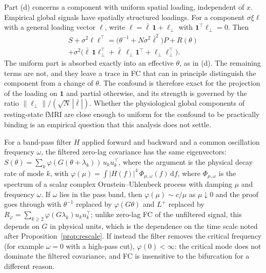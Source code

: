 \begin{remark}\label{rem:loading}
Part (d) concerns a component with uniform spatial loading, independent of $x$. Empirical global
signals have spatially structured loadings. For a component $\sigma\xi\ell$ with a general loading
vector $\ell$, write $\ell=\bar\ell\,\mathbf 1+\ell_\perp$ with $\mathbf 1^{\top}\ell_\perp=0$. Then
\begin{multline*}
  S+\sigma^{2}\ell\ell^{\top}=\bigl(\theta^{-1}+N\sigma^{2}\bar\ell^{2}\bigr)P+R(\theta)\\
  +\sigma^{2}\bigl(\bar\ell\,\mathbf 1\ell_\perp^{\top}+\bar\ell\,\ell_\perp\mathbf 1^{\top}+\ell_\perp\ell_\perp^{\top}\bigr).
\end{multline*}
The uniform part is absorbed exactly into an effective $\theta$, as in (d). The remaining terms are
not, and they leave a trace in FC that can in principle distinguish the component from a change of
$\theta$. The confound is therefore exact for the projection of the loading on $\mathbf 1$ and partial
otherwise, and its strength is governed by the ratio $\|\ell_\perp\|/(\sqrt N\,|\bar\ell|)$. Whether
the physiological global components of resting-state fMRI are close enough to uniform for the
confound to be practically binding is an empirical question that this analysis does not settle.
\end{remark}

\begin{remark}\label{rem:gsr-filter}
For a band-pass filter $H$ applied forward and backward and a common oscillation frequency $\omega$, the filtered zero-lag
covariance has the same eigenvectors:
$S(\theta)=\sum_k\varphi(G(\theta+\lambda_k))\,u_ku_k^{\top}$, where the argument is the physical decay rate of mode $k$, with
$\varphi(\mu)=\int|H(f)|^{4}\,\Phi_{\mu,\omega}(f)\,\mathrm df$, where $\Phi_{\mu,\omega}$ is the spectrum
of a scalar complex Ornstein--Uhlenbeck process with damping $\mu$ and frequency $\omega$. If
$\omega$ lies in the pass band, then $\varphi(\mu)\sim c/\mu$ as $\mu\downarrow0$ and the proof goes
through with $\theta^{-1}$ replaced by $\varphi(G\theta)$ and $L^{+}$ replaced by
$R_\varphi=\sum_{k\ge2}\varphi(G\lambda_k)u_ku_k^{\top}$; unlike zero-lag FC of the unfiltered signal, this depends on $G$ in physical units, which is the dependence on the time scale noted after Proposition~\ref{prop:rescale}. If instead the filter removes the critical
frequency (for example $\omega=0$ with a high-pass cut), $\varphi(0)<\infty$: the critical mode does not
dominate the filtered covariance, and FC is insensitive to the bifurcation for a different reason.
\end{remark}

